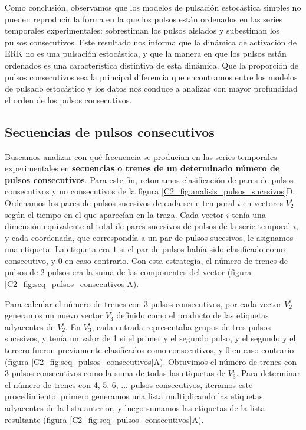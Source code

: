 \documentclass[./main.tex]{subfiles}
\begin{document}
Como conclusión, observamos que los modelos de pulsación estocástica simples no pueden reproducir la forma en la que los pulsos están ordenados en las series temporales experimentales: sobrestiman los pulsos aislados y subestiman los pulsos consecutivos. Este resultado nos informa que la dinámica de activación de ERK no es una pulsación estocástica, y que la manera en que los pulsos están ordenados es una característica distintiva de esta dinámica. Que la proporción de pulsos consecutivos sea la principal diferencia que encontramos entre los modelos de pulsado estocástico y los datos nos conduce a analizar con mayor profundidad el orden de los pulsos consecutivos. 


\subsection{Secuencias de pulsos consecutivos}
\label{C2_ssec:seq_pulsos_cons}


Buscamos analizar con qué frecuencia se producían en las series temporales experimentales en \textbf{secuencias o trenes de un determinado número de pulsos consecutivos}. Para este fin, retomamos clasificación de pares de pulsos consecutivos y no consecutivos de la figura \ref{C2_fig:analisis_pulsos_sucesivos}D. Ordenamos los pares de pulsos sucesivos de cada serie temporal $i$ en vectores $V^i_2$ según el tiempo en el que aparecían en la traza. Cada vector $i$ tenía una dimensión equivalente al total de pares sucesivos de pulsos de la serie temporal $i$, y cada coordenada, que correspondía a un par de pulsos sucesivos, le asignamos una etiqueta. La etiqueta era $1$ si el par de pulsos había sido clasificado como consecutivo, y $0$ en caso contrario. Con esta estrategia, el número de trenes de pulsos de $2$ pulsos era la suma de las componentes del vector (figura \ref{C2_fig:seq_pulsos_consecutivos}A).


Para calcular el número de trenes con $3$ pulsos consecutivos, por cada vector $V^i_2$ generamos un nuevo vector $V^i_3$ definido como el producto de las etiquetas adyacentes de $V^i_2$. En $V^i_3$, cada entrada representaba grupos de tres pulsos sucesivos, y tenía un valor de 1 si el primer y el segundo pulso, y el segundo y el tercero fueron previamente clasificados como consecutivos, y 0 en caso contrario (figura \ref{C2_fig:seq_pulsos_consecutivos}A). Obtuvimos el número de trenes con 3 pulsos consecutivos como la suma de todas las etiquetas de $V^i_3$. Para determinar el número de trenes con 4, 5, 6, ... pulsos consecutivos, iteramos este procedimiento: primero generamos una lista multiplicando las etiquetas adyacentes de la lista anterior, y luego sumamos las etiquetas de la lista resultante (figura \ref{C2_fig:seq_pulsos_consecutivos}A).
\end{document}
